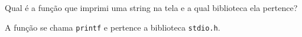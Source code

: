 \begin{Exercise}[label={0001}, difficulty={0}, origin={io}]
  Qual é a função que imprimi uma string na tela e a qual biblioteca ela
  pertence?
\end{Exercise}
\begin{Answer}[ref={0001}]
  A função se chama \lstinline+printf+ e pertence a biblioteca
  \lstinline+stdio.h+.
\end{Answer}
